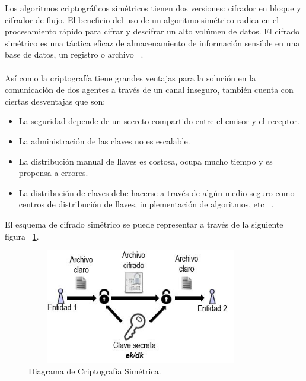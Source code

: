 
Los algoritmos criptográficos simétricos tienen dos versiones: cifrador en bloque y cifrador de flujo. El beneficio del uso de un algoritmo simétrico radica en el procesamiento rápido para cifrar y descifrar un alto volúmen de datos. El cifrado simétrico es una táctica eficaz de almacenamiento de información sensible en una base de datos, un registro o archivo  ~\cite{sime}. 
\\  \\
Así como la criptografía tiene grandes ventajas para la solución en la comunicación de dos agentes a través de un canal inseguro, también cuenta con ciertas desventajas que son: 

\begin{itemize}
	\item La seguridad depende de un secreto compartido entre el emisor y el receptor.
	\item La administración de las claves no es escalable.
	\item La distribución manual de llaves es costosa, ocupa mucho tiempo y es propensa a errores.
	\item La distribución de claves debe hacerse a través de algún medio seguro como centros de distribución de llaves, implementación de algoritmos, etc ~\cite{ventajasime}. 
\end{itemize}

El esquema de cifrado simétrico se puede representar a través de la siguiente figura ~\ref{fig:2-3-1}.
\begin{figure}[H]
\centering
	\includegraphics[width=10cm, height=5cm]{./images/Cripto_Simetrica.jpg}
	\caption{Diagrama de Criptografía Simétrica.}
	\label{fig:2-3-1}
\end{figure}


